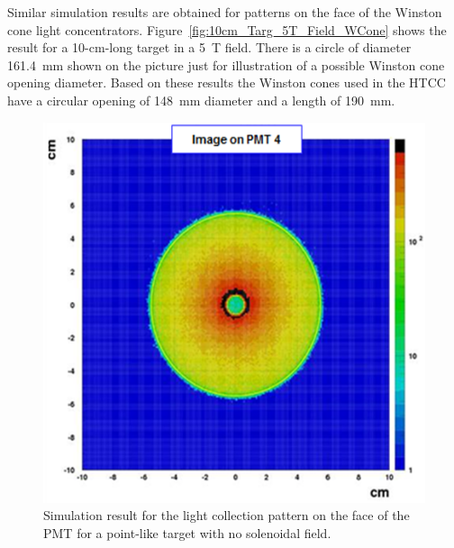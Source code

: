 Similar simulation results are obtained for patterns on the face of the Winston cone light concentrators.
Figure~\ref{fig:10cm_Targ_5T_Field_WCone} shows the result for a 10-cm-long target in a 5~T field. There is a
circle of diameter 161.4~mm shown on the picture just for illustration of a possible Winston cone opening diameter.
Based on these results the Winston cones used in the HTCC have a circular opening of 148~mm diameter and a
length of 190~mm. 

\begin{figure}[!ht]
    \centering
    \includegraphics[width=1.0\linewidth,trim={0.0cm 0.0cm 0.0cm 0.0cm},clip]{images/Point_Targ_Zero_Field_PMT.png}
    \caption{Simulation result for the light collection pattern on the face of the PMT for a point-like target with no
      solenoidal field.}
    \label{fig:Point_Targ_Zero_Field_PMT}
\end{figure}


